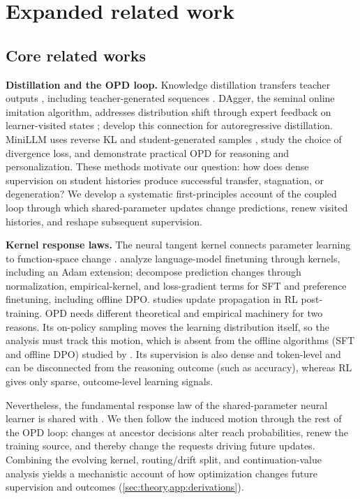 \section{Expanded related work}
\label{app:related-work}
\subsection{Core related works}
\noindent\textbf{Distillation and the OPD loop.}
Knowledge distillation transfers teacher outputs \citep{hinton2015distillingknowledgeneuralnetwork}, including teacher-generated sequences \citep{kim2016sequence}. DAgger, the seminal online imitation algorithm, addresses distribution shift through expert feedback on learner-visited states \citep{ross2011reduction}; \citet{lin2020autoregressiveknowledgedistillationimitation} develop this connection for autoregressive distillation. MiniLLM uses reverse KL and student-generated samples \citep{gu2023minillm},  \citep{agarwal2024onpolicydistillation,piskorz2026onpolicyoffpolicylearningsystematic} study the choice of divergence loss, and \citet{tinker_opd_2025} demonstrate practical OPD for reasoning and personalization. These methods motivate our question: how does dense supervision on student histories produce successful transfer, stagnation, or degeneration? We develop a systematic first-principles account of the coupled loop through which shared-parameter updates change predictions, renew visited histories, and reshape subsequent supervision.

\noindent\textbf{Kernel response laws.}
The neural tangent kernel connects parameter learning to function-space change \citep{jacot2018neural}. \citet{malladi2023kernelbasedviewlanguagemodel} analyze language-model finetuning through kernels, including an Adam extension; \citet{ren2025learning} decompose prediction changes through normalization, empirical-kernel, and loss-gradient terms for SFT and preference finetuning, including offline DPO. \citet{tomihari2026rl} studies update propagation in RL post-training. OPD needs different theoretical and empirical machinery for two reasons. Its on-policy sampling moves the learning distribution itself, so the analysis must track this motion, which is absent from the offline algorithms (SFT and offline DPO) studied by \citet{ren2025learning}. Its supervision is also dense and token-level and can be disconnected from the reasoning outcome (such as accuracy), whereas RL gives only sparse, outcome-level learning signals.

Nevertheless, the fundamental response law of the shared-parameter neural learner is shared with \citet{ren2025learning}. We then follow the induced motion through the rest of the OPD loop: changes at ancestor decisions alter reach probabilities, renew the training source, and thereby change the requests driving future updates. Combining the evolving kernel, routing/drift split, and continuation-value analysis yields a mechanistic account of how optimization changes future supervision and outcomes (\cref{sec:theory,app:derivations}).


